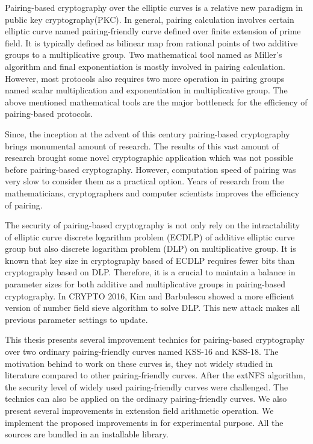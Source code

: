Pairing-based cryptography over the elliptic curves is a relative new paradigm in public key cryptography(PKC). 
In general, pairing calculation involves certain elliptic curve named pairing-friendly curve defined over finite extension of prime field.
It is typically defined as bilinear map from rational points of two additive groups to a multiplicative group.
Two mathematical tool named as Miller's algorithm and final exponentiation is mostly involved in pairing calculation.
However, most protocols also requires two more operation in pairing groups named scalar multiplication and exponentiation in multiplicative group.
The above mentioned mathematical tools are the major bottleneck for the efficiency of pairing-based protocols.

Since, the inception at the advent of this century pairing-based cryptography brings monumental amount of research. 
The results of this vast amount of research brought some novel cryptographic application which was not possible before pairing-based cryptography. 
However, computation speed of pairing was very slow to consider them as a practical option.
Years of research from the mathematicians, cryptographers and computer scientists improves the efficiency of pairing.

The security of pairing-based cryptography is not only rely on the intractability of elliptic curve discrete logarithm problem (ECDLP) of additive elliptic curve group but also  discrete logarithm problem (DLP) on multiplicative group.
It is known that key size in cryptography based of ECDLP requires fewer bits than cryptography based on DLP.
Therefore, it is a crucial to maintain a balance in parameter sizes for both additive and multiplicative groups in pairing-based cryptography.
In CRYPTO 2016, Kim and Barbulescu showed a more efficient version of number field sieve algorithm to solve DLP. 
This new attack makes all previous parameter settings to update.

This thesis presents several improvement technics for pairing-based cryptography over two ordinary pairing-friendly curves named KSS-16 and KSS-18.
The motivation behind to work on these curves is, they not widely studied in literature compared to other pairing-friendly curves.
After the extNFS algorithm, the security level of widely used pairing-friendly curves were challenged.
The technics can also be applied on the ordinary pairing-friendly curves.
We also present several improvements in extension field arithmetic operation. 
We implement the proposed improvements in for experimental purpose.
All the sources are bundled in an installable library.